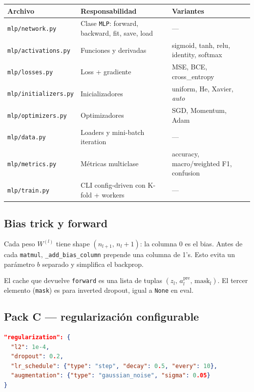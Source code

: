 \documentclass[11pt,a4paper]{article}
\newcommand{\code}[1]{\texttt{\textcolor{accent}{#1}}}
\newcommand{\file}[1]{\texttt{\small #1}}
\begin{document}
\begin{center}
\begin{tabular}{@{}lll@{}}
\toprule
\textbf{Archivo} & \textbf{Responsabilidad} & \textbf{Variantes} \\
\midrule
\file{mlp/network.py}      & Clase \code{MLP}: forward, backward, fit, save, load & --- \\
\file{mlp/activations.py}  & Funciones y derivadas                  & sigmoid, tanh, relu, identity, softmax \\
\file{mlp/losses.py}       & Loss + gradiente                        & MSE, BCE, cross\_entropy \\
\file{mlp/initializers.py} & Inicializadores                         & uniform, He, Xavier, \emph{auto} \\
\file{mlp/optimizers.py}   & Optimizadores                           & SGD, Momentum, Adam \\
\file{mlp/data.py}         & Loaders y mini-batch iteration          & --- \\
\file{mlp/metrics.py}      & Métricas multiclase                     & accuracy, macro/weighted F1, confusion \\
\file{mlp/train.py}        & CLI config-driven con K-fold + workers  & --- \\
\bottomrule
\end{tabular}
\end{center}

\subsection{Bias trick y forward}
Cada peso \(W^{(l)}\) tiene shape \((n_{l+1},\, n_l + 1)\): la columna 0 es el bias. Antes de cada \texttt{matmul}, \code{\_add\_bias\_column} prepende una columna de 1's. Esto evita un parámetro \(b\) separado y simplifica el backprop.

El cache que devuelve \code{forward} es una lista de tuplas \((z_l,\, a_l^{\text{pre}},\, \text{mask}_l)\). El tercer elemento (\code{mask}) es para inverted dropout, igual a \code{None} en eval.

\subsection{Pack C — regularización configurable}

\begin{lstlisting}[language=json, caption={Bloque \texttt{regularization} de un config Pack C}, captionpos=b]
"regularization": {
  "l2": 1e-4,
  "dropout": 0.2,
  "lr_schedule": {"type": "step", "decay": 0.5, "every": 10},
  "augmentation": {"type": "gaussian_noise", "sigma": 0.05}
}
\end{lstlisting}
\end{document}
